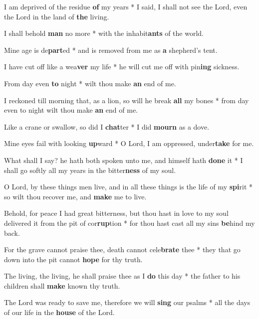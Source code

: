 \begin{multicols}{2}
	I am deprived of the residue \textbf{of} my years * I said, I shall not see the Lord, even the Lord in the land of \textbf{the} living.
	
	I shall behold \textbf{man} no more * with the inhabit\textbf{ants} of the world.
	
	Mine age is de\textbf{part}ed * and is removed from me as \textbf{a} shepherd's tent.
	
	I have cut off like a wea\textbf{ver} my life * he will cut me off with pin\textbf{ing} sickness.
	
	From day even \textbf{to} night * wilt thou make \textbf{an} end of me.
	
	I reckoned till morning that, as a lion, so will he break \textbf{all} my bones * from day even to night wilt thou make \textbf{an} end of me.
	
	Like a crane or swallow, so did I \textbf{chat}ter * I did \textbf{mourn} as a dove.
	
	Mine eyes fail with looking \textbf{up}ward * O Lord, I am oppressed, under\textbf{take} for me.
	
	What shall I say? he hath both spoken unto me, and himself hath \textbf{done} it * I shall go softly all my years in the bitter\textbf{ness} of my soul.
	
	O Lord, by these things men live, and in all these things is the life of my \textbf{spi}rit * so wilt thou recover me, and \textbf{make} me to live.
	
	Behold, for peace I had great bitterness, but thou hast in love to my soul delivered it from the pit of cor\textbf{rup}tion * for thou hast cast all my sins \textbf{be}hind my back.
	
	For the grave cannot praise thee, death cannot cele\textbf{brate} thee * they that go down into the pit cannot \textbf{hope} for thy truth.
	
	The living, the living, he shall praise thee as I \textbf{do} this day * the father to his children shall \textbf{make} known thy truth.
	
	The Lord was ready to save me, therefore we will \textbf{sing} our psalms * all the days of our life in the \textbf{house} of the Lord.
\end{multicols}